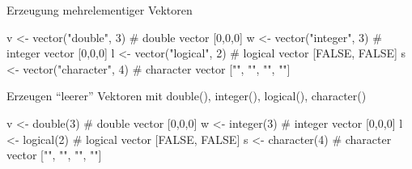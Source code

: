 \documentclass[
  8pt,
  ignorenonframetext,
]{beamer}
\newenvironment{Shaded}{\begin{snugshade}}{\end{snugshade}}
\newcommand{\CommentTok}[1]{\textcolor[rgb]{0.37,0.37,0.37}{#1}}
\newcommand{\DecValTok}[1]{\textcolor[rgb]{0.68,0.00,0.00}{#1}}
\newcommand{\FunctionTok}[1]{\textcolor[rgb]{0.28,0.35,0.67}{#1}}
\newcommand{\NormalTok}[1]{\textcolor[rgb]{0.00,0.23,0.31}{#1}}
\newcommand{\OtherTok}[1]{\textcolor[rgb]{0.00,0.23,0.31}{#1}}
\newcommand{\StringTok}[1]{\textcolor[rgb]{0.13,0.47,0.30}{#1}}
\begin{document}
\begin{frame}[fragile]{Erzeugung mehrelementiger Vektoren}
\begin{Shaded}
\begin{Highlighting}[]
\NormalTok{v }\OtherTok{\textless{}{-}} \FunctionTok{vector}\NormalTok{(}\StringTok{"double"}\NormalTok{, }\DecValTok{3}\NormalTok{)           }\CommentTok{\# double vector [0,0,0]}
\NormalTok{w }\OtherTok{\textless{}{-}} \FunctionTok{vector}\NormalTok{(}\StringTok{"integer"}\NormalTok{, }\DecValTok{3}\NormalTok{)          }\CommentTok{\# integer vector [0,0,0]}
\NormalTok{l }\OtherTok{\textless{}{-}} \FunctionTok{vector}\NormalTok{(}\StringTok{"logical"}\NormalTok{, }\DecValTok{2}\NormalTok{)          }\CommentTok{\# logical vector [FALSE, FALSE]}
\NormalTok{s }\OtherTok{\textless{}{-}} \FunctionTok{vector}\NormalTok{(}\StringTok{"character"}\NormalTok{, }\DecValTok{4}\NormalTok{)        }\CommentTok{\# character vector ["", "", "", ""]}
\end{Highlighting}
\end{Shaded}

\small

Erzeugen ``leerer'' Vektoren mit double(), integer(), logical(),
character()

\tiny

\begin{Shaded}
\begin{Highlighting}[]
\NormalTok{v }\OtherTok{\textless{}{-}} \FunctionTok{double}\NormalTok{(}\DecValTok{3}\NormalTok{)                     }\CommentTok{\# double vector [0,0,0]}
\NormalTok{w }\OtherTok{\textless{}{-}} \FunctionTok{integer}\NormalTok{(}\DecValTok{3}\NormalTok{)                    }\CommentTok{\# integer vector [0,0,0]}
\NormalTok{l }\OtherTok{\textless{}{-}} \FunctionTok{logical}\NormalTok{(}\DecValTok{2}\NormalTok{)                    }\CommentTok{\# logical vector [FALSE, FALSE]}
\NormalTok{s }\OtherTok{\textless{}{-}} \FunctionTok{character}\NormalTok{(}\DecValTok{4}\NormalTok{)                  }\CommentTok{\# character vector ["", "", "", ""]}
\end{Highlighting}
\end{Shaded}
\end{frame}
\end{document}
